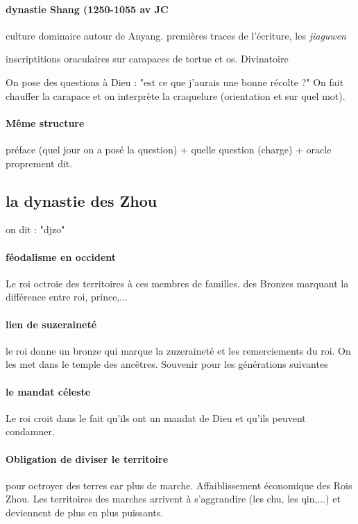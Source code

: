 \paragraph{dynastie Shang (1250-1055 av JC} culture dominaire autour de Anyang. premières traces de l'écriture, les \textit{jiaguwen}

\begin{Def}[juaguwen]
    inscriptitions oraculaires sur carapaces de tortue et os.
    Divinatoire
\end{Def}

On pose des questions à Dieu : "est ce que j'aurais une bonne récolte ?"
On fait chauffer la carapace et on interprète la craquelure (orientation et sur quel mot). 
\paragraph{Même structure} préface (quel jour on a posé la question) + quelle question (charge) + oracle proprement dit. 

\subsection{la dynastie des Zhou}
on dit : "djzo"

\paragraph{féodalisme en occident} Le roi octroie des territoires à ces membres de familles.  des Bronzes marquant la différence entre roi, prince,...


\paragraph{lien de suzeraineté} le roi donne un bronze qui marque la zuzeraineté et les remerciements du roi. On les met dans le temple des ancêtres. Souvenir pour les générations suivantes

\paragraph{le mandat céleste} Le roi croit dans le fait qu'ils ont un mandat de Dieu et qu'ils peuvent condamner.

\paragraph{Obligation de diviser le territoire} pour octroyer des terres car plus de marche. Affaiblissement économique des Rois Zhou.
Les territoires des marches arrivent à s'aggrandire (les chu, les qin,...) et deviennent de plus en plus puissants. 

